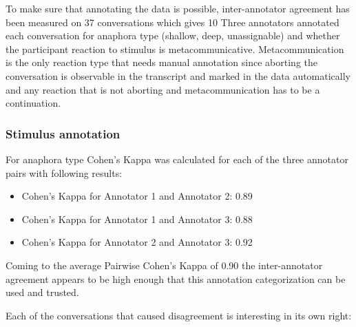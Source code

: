 \documentclass[12pt]{report}
\begin{document}
{To make sure that annotating the data is possible,
inter-annotator agreement has been measured on 37 conversations which gives 10%
Three annotators annotated each conversation for anaphora type (shallow, deep, unassignable) and
whether the participant reaction to stimulus is metacommunicative.
Metacommunication is the only reaction type that needs manual annotation since
aborting the conversation is
observable in the transcript and marked in the data automatically
and any reaction that is not aborting and metacommunication has to be a continuation.

\subsubsection{Stimulus annotation}

For anaphora type Cohen's Kappa was calculated for each of the three annotator pairs
with following results:

\begin{itemize}[label={}]
    \item Cohen's Kappa for Annotator 1 and Annotator 2: 0.89
    \item Cohen's Kappa for Annotator 1 and Annotator 3: 0.88
    \item Cohen's Kappa for Annotator 2 and Annotator 3: 0.92
\end{itemize}

Coming to the average Pairwise Cohen's Kappa of 0.90
the inter-annotator agreement appears to be high enough
that this annotation categorization can be used and trusted.

Each of the conversations that caused disagreement is interesting in its own right:


}
\end{document}
